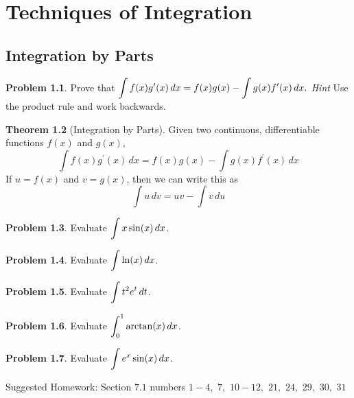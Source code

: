 \documentclass[letterpaper, twoside, 12pt]{book}
\theoremstyle{definition}
\newtheorem{theorem}{Theorem}
\theoremstyle{definition}
\newtheorem{problem}[theorem]{Problem}
\newcommand{\ds}{\ensuremath{\displaystyle}}
\begin{document}
\setcounter{chapter}{6}

\chapter{Techniques of Integration}

\section{Integration by Parts}

\begin{problem}
 Prove that
 $\ds \int f(x)g^\prime(x) \, dx = f(x)g(x) - \int g(x)f^\prime(x) \, dx.$
 \emph{Hint}  Use the product rule and work backwards.
\end{problem}

\vfill

\begin{theorem}[Integration by Parts]
 Given two continuous, differentiable functions $f(x)$ and $g(x)$,
 $$\int f(x)g^\prime(x) \, dx = f(x)g(x) - \int g(x)f^\prime(x) \, dx$$
 If $u = f(x)$ and $v = g(x)$, then we can write this as
 $$\int u \, dv = uv - \int v \, du$$
\end{theorem}

\begin{problem}
 Evaluate $\ds \int x\sin(x) \, dx$.
\end{problem}

\vfill

\newpage

\begin{problem}
 Evaluate $\ds \int \ln(x) \, dx$.
\end{problem}

\vfill

\begin{problem}
 Evaluate $\ds \int t^2e^t \, dt$.
\end{problem}

\vfill

\newpage

\begin{problem}
 Evaluate $\ds \int_0^1 \arctan(x) \, dx$.
\end{problem}

\vfill

\begin{problem}
 Evaluate $\ds \int e^x \sin(x) \, dx$.
\end{problem}

\vfill

\noindent Suggested Homework: Section $7.1$ numbers $1 - 4,$ $7,$ $10 - 12,$ $21,$ $24,$ $29,$ $30,$ $31$
\end{document}

